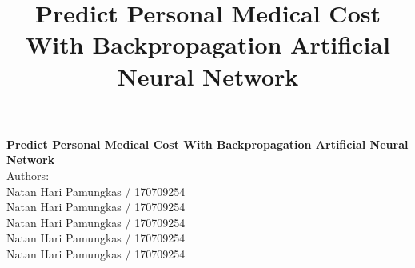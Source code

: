 \documentclass[a4paper, 12pt]{article}
\title{Predict Personal Medical Cost With Backpropagation Artificial Neural Network}
\date{}
\begin{document}
\centering
\textbf{\Large Predict Personal Medical Cost With Backpropagation Artificial Neural Network}\\
\vspace{0.5cm}
\small Authors:\\
\scriptsize Natan Hari Pamungkas / 170709254\\
\scriptsize Natan Hari Pamungkas / 170709254\\
\scriptsize Natan Hari Pamungkas / 170709254\\
\scriptsize Natan Hari Pamungkas / 170709254\\
\scriptsize Natan Hari Pamungkas / 170709254\\

\begin{abstract}
\end{abstract}
\end{document}
